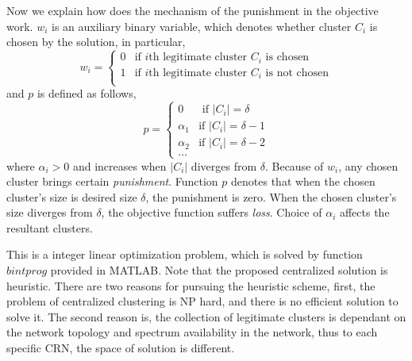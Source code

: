 \documentclass[10pt,journal,compsoc]{IEEEtran}
\theoremstyle{mytheoremstyle}
\theoremstyle{mytheoremstyle}
\theoremstyle{mytheoremstyle}
\begin{document}
Now we explain how does the mechanism of the punishment in the objective work. 
$w_i$ is an auxiliary binary variable, which denotes whether cluster $C_i$ is chosen by the solution, in particular, 
$$
w_i = \left\{ \begin{array}{rl}
0 &\mbox{if $i$th legitimate cluster $C_i$ is chosen} \\
1 &\mbox{if $i$th legitimate cluster $C_i$ is not chosen} \\
\end{array} \right.
$$
and $p$ is defined as follows,
$$
p = \left\{ \begin{array}{rl}
0 &\mbox{ if $|C_i|=\delta$} \\
\alpha_1 &\mbox{if $|C_i|=\delta-1$} \\
\alpha_2 &\mbox{if $|C_i|=\delta-2$} \\
\dots
\end{array} \right.
$$
where $\alpha_i>0$ and increases when $|C_i|$ diverges from $\delta$.
Because of $w_i$, any chosen cluster brings certain \textit{punishment}.
Function $p$ denotes that when the chosen cluster's size is desired size $\delta$, the punishment is zero.
When the chosen cluster's size diverges from $\delta$, the objective function suffers \textit{loss}.
%
Choice of $\alpha_i$ affects the resultant clusters.







This is a integer linear optimization problem, which is solved by function $bintprog$ provided in MATLAB.
Note that the proposed centralized solution is heuristic.
There are two reasons for pursuing the heuristic scheme, first, the problem of centralized clustering is NP hard, and there is no efficient solution to solve it.
The second reason is, the collection of legitimate clusters is dependant on the network topology and spectrum availability in the network, thus to each specific CRN, the space of solution is different.
\end{document}
